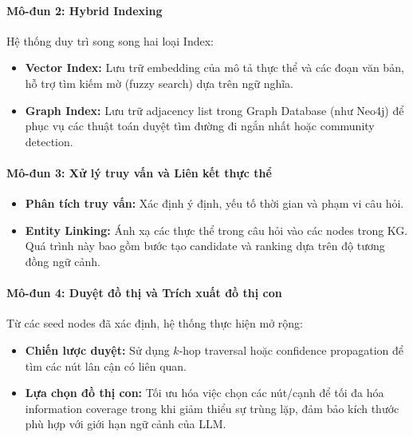 \paragraph{Mô-đun 2: Hybrid Indexing}
Hệ thống duy trì song song hai loại Index:
\begin{itemize}
    \item \textbf{Vector Index:} Lưu trữ embedding của mô tả thực thể và các đoạn văn bản, hỗ trợ tìm kiếm mờ (fuzzy search) dựa trên ngữ nghĩa.
    \item \textbf{Graph Index:} Lưu trữ adjacency list trong Graph Database (như Neo4j) để phục vụ các thuật toán duyệt tìm đường đi ngắn nhất hoặc community detection.
\end{itemize}

\paragraph{Mô-đun 3: Xử lý truy vấn và Liên kết thực thể}
\begin{itemize}
    \item \textbf{Phân tích truy vấn:} Xác định ý định, yếu tố thời gian và phạm vi câu hỏi.
    \item \textbf{Entity Linking:} Ánh xạ các thực thể trong câu hỏi vào các nodes trong KG. Quá trình này bao gồm bước tạo candidate và ranking dựa trên độ tương đồng ngữ cảnh.
\end{itemize}

\paragraph{Mô-đun 4: Duyệt đồ thị và Trích xuất đồ thị con}
Từ các seed nodes đã xác định, hệ thống thực hiện mở rộng:
\begin{itemize}
    \item \textbf{Chiến lược duyệt:} Sử dụng $k$-hop traversal hoặc confidence propagation để tìm các nút lân cận có liên quan.
    \item \textbf{Lựa chọn đồ thị con:} Tối ưu hóa việc chọn các nút/cạnh để tối đa hóa information coverage trong khi giảm thiểu sự trùng lặp, đảm bảo kích thước phù hợp với giới hạn ngữ cảnh của LLM.
\end{itemize}

